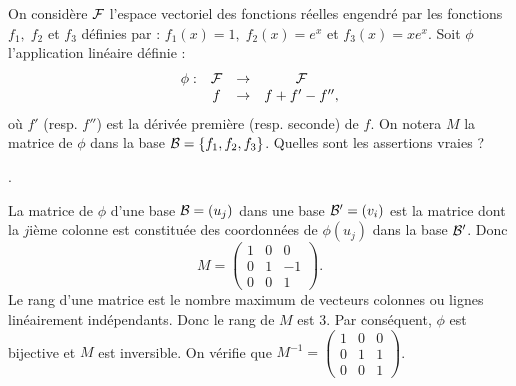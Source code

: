 \begin{question}
On considère ${\cal F}$ l'espace vectoriel des fonctions réelles engendré par les fonctions $f_1, \; f_2$ et  $f_3$ définies par  : 
$f_1(x)=1, \; f_2(x)=e^x$ et  $f_3(x)=xe^x$. Soit $\phi$ l'application linéaire définie : 
$$\begin{array}{rccc}\phi:& {\cal F}&\to& {\cal F}\\
& f&\to &f+f'-f'',  \end{array}$$
où $f'$ (resp. $f''$) est la dérivée première (resp. seconde) de $f$. On notera $M$ la matrice de $\phi$ dans la base ${\cal B}=\{f_1, f_2,f_3\}$. Quelles sont les assertions vraies ?
\begin{answers}  
.
\end{answers}
\vskip2mm
\begin{explanations} La matrice de $\phi$ d'une base $ {\cal {B}}=(u_j)$ dans une base $ {\cal {B}}'=(v_i)$ est la matrice  dont la $j$ième colonne est constituée des coordonnées de $\phi(u_j)$ dans la base $ {\cal {B}}'$. Donc
$$M= \left(\begin{array}{rcc}
1&0&0\\0&1&-1\\ 0&0&1\end{array}\right).$$
Le rang d'une matrice est le nombre maximum de vecteurs colonnes ou lignes linéairement indépendants. Donc le rang de $M$ est $3$. Par conséquent, $\phi$ est bijective et $M$ est inversible. On vérifie que 
$M^{-1} = \left(\begin{array}{rcc}1&0&0\\
0&1&1\\ 0&0&1\end{array}\right)$.
\end{explanations}
\end{question}

